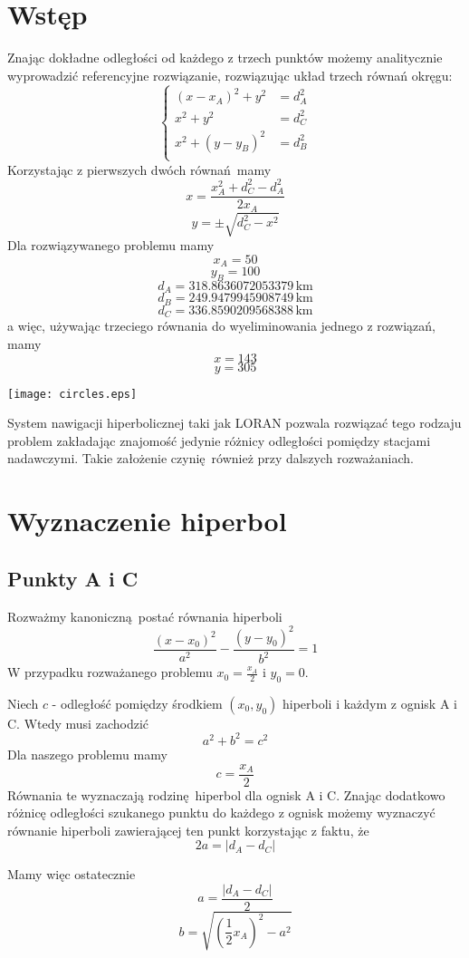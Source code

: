 \documentclass[11pt]{article}
\begin{document}
\section{Wstęp}
Znając dokładne odległości od każdego z trzech punktów możemy analitycznie
wyprowadzić referencyjne rozwiązanie, rozwiązując układ trzech równań okręgu:
\[
    \begin{cases}
        (x - x_A)^2 + y^2 &= d_A^2 \\
        x^2 + y^2 &= d_C^2 \\
        x^2 + (y-y_B)^2 &= d_B^2 \\
    \end{cases}
\]
Korzystając z pierwszych dwóch równań mamy
\[ x = \frac{x_A^2 + d_C^2 - d_A^2}{2x_A} \]
\[ y = \pm \sqrt{d_C^2 - x^2} \]
Dla rozwiązywanego problemu mamy
\[ x_A = 50 \]
\[ y_B = 100 \]
\[ d_A = 318.8636072053379 \, \mbox{km} \]
\[ d_B = 249.9479945908749 \, \mbox{km} \]
\[ d_C = 336.8590209568388 \, \mbox{km} \]
a więc, używając trzeciego równania do wyeliminowania jednego z rozwiązań, mamy
\[ x = 143 \]
\[ y = 305 \]

\texttt{[image: circles.eps]}

System nawigacji hiperbolicznej taki jak LORAN pozwala rozwiązać tego rodzaju
problem zakładając znajomość jedynie różnicy odległości pomiędzy stacjami
nadawczymi.  Takie założenie czynię również przy dalszych rozważaniach.


\section{Wyznaczenie hiperbol}
\subsection{Punkty A i C}
Rozważmy kanoniczną postać równania hiperboli
\[ \frac{(x-x_0)^2}{a^2} - \frac{(y-y_0)^2}{b^2} = 1 \]
W przypadku rozważanego problemu $x_0 = \frac{x_A}{2}$ i $y_0 = 0$.

Niech $c$ - odległość pomiędzy środkiem $(x_0, y_0)$ hiperboli i każdym z ognisk
A i C.  Wtedy musi zachodzić
\[ a^2 + b^2 = c^2 \]
Dla naszego problemu mamy
\[ c = \frac{x_A}{2} \]
Równania te wyznaczają rodzinę hiperbol dla ognisk A i C.  Znając dodatkowo
różnicę odległości szukanego punktu do każdego z ognisk możemy wyznaczyć równanie
hiperboli zawierającej ten punkt korzystając z faktu, że
\[ 2a = |d_A - d_C| \]

Mamy więc ostatecznie
\[ a = \frac{|d_A - d_C|}{2} \]
\[ b = \sqrt{\left(\frac 1 2 x_A\right)^2 - a^2} \]
\end{document}
